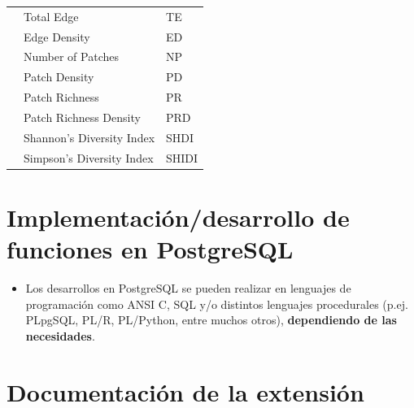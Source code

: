 \begin{table}[]
\begin{tabular}{lll}
                           & Total Edge                           & TE                   \\
                           & Edge Density                         & ED                   \\
                           & Number of Patches                    & NP                   \\
                           & Patch Density                        & PD                   \\
                           & Patch Richness                       & PR                   \\
                           & Patch Richness Density               & PRD                  \\
                           & Shannon's Diversity Index            & SHDI                 \\
                           & Simpson's Diversity Index            & SHIDI                \\ \hline
\end{tabular}
\end{table}


\section{Implementación/desarrollo de funciones en PostgreSQL}

\begin{graybox}
\begin{itemize}
\item Los desarrollos en PostgreSQL se pueden realizar en lenguajes de programación como ANSI C, SQL y/o distintos lenguajes procedurales (p.ej. PLpgSQL, PL/R, PL/Python, entre muchos otros), \textbf{dependiendo de las necesidades}.
\end{itemize}
\end{graybox}














\section{Documentación de la extensión}

